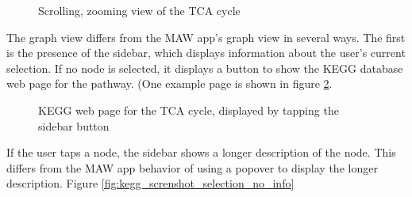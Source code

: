 \begin{figure}[hbt]
    \caption{\label{fig:kegg_screenshot_pathway} Scrolling, zooming view of
    the TCA cycle}
\end{figure}


The graph view differs from the MAW app's graph view in several ways. The first
is the presence of the sidebar, which displays information about the user's
current selection. If no node is selected, it displays a button to show the KEGG
database web page for the pathway. (One example page is shown in figure
\ref{fig:kegg_screenshot_kegg_web_site}.

\begin{figure}[hbt]
    \caption{\label{fig:kegg_screenshot_kegg_web_site} KEGG web page for the TCA
    cycle, displayed by tapping the sidebar button}
\end{figure}

If the user taps a node, the sidebar shows a longer description of the node.
This differs from the MAW app behavior of using a popover to display the longer
description. Figure \ref{fig:kegg_screnshot_selection_no_info}

